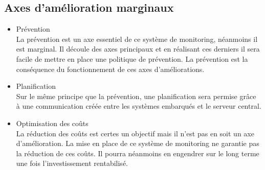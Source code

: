 \subsection{Axes d'amélioration marginaux}

\begin{itemize}
	\item Prévention \\
	La prévention est un axe essentiel de ce système de monitoring, néanmoins il est marginal. Il découle des axes principaux et en réalisant ces derniers il sera facile de mettre en place une politique de prévention. La prévention est la conséquence du fonctionnement de ces axes d'améliorations.

	\item Planification \\
	Sur le même principe que la prévention, une planification sera permise grâce à une communication créée entre les systèmes embarqués et le serveur central.

	\item Optimisation des coûts \\
		La réduction des coûts est certes un objectif mais il n'est pas en soit un axe d'amélioration. La mise en place de ce système de monitoring ne garantie pas la réduction de ces coûts. Il pourra néanmoins en engendrer sur le long terme une fois l'investissement rentabilisé.
	
\end{itemize}

